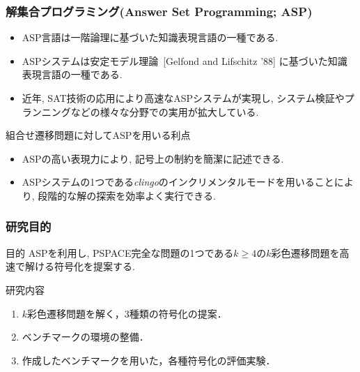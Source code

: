 \documentclass[dvipdfmx,11pt]{beamer}
\begin{document}
\begin{frame}\frametitle{解集合プログラミング(Answer Set Programming; ASP)}

  \begin{itemize}
    \item ASP言語は一階論理に基づいた知識表現言語の一種である.
    \item ASPシステムは安定モデル理論~[Gelfond and Lifschitz '88] に基づいた知識表現言語の一種である.
    \item 近年, SAT技術の応用により高速なASPシステムが実現し, システム検証やプランニングなどの様々な分野での実用が拡大している.
  \end{itemize}

  \begin{alertblock}{組合せ遷移問題に対してASPを用いる利点}
    \begin{itemize}
      \item ASPの高い表現力により, 記号上の制約を簡潔に記述できる.
      \item ASPシステムの1つである\textit{clingo}のインクリメンタルモードを用いることにより, 段階的な解の探索を効率よく実行できる.
    \end{itemize}
  \end{alertblock}
  
\end{frame}


\begin{frame}\frametitle{研究目的}
  \begin{alertblock}{目的}
    ASPを利用し, PSPACE完全な問題の1つである$k \ge 4$の$k$彩色遷移問題を高速で解ける符号化を提案する.
  \end{alertblock}

  \begin{block}{研究内容}
    \begin{enumerate}
      \item $k$彩色遷移問題を解く，3種類の符号化の提案．
      \item ベンチマークの環境の整備．
      \item 作成したベンチマークを用いた，各種符号化の評価実験．
    \end{enumerate}
  \end{block}

\end{frame}

\end{document}
